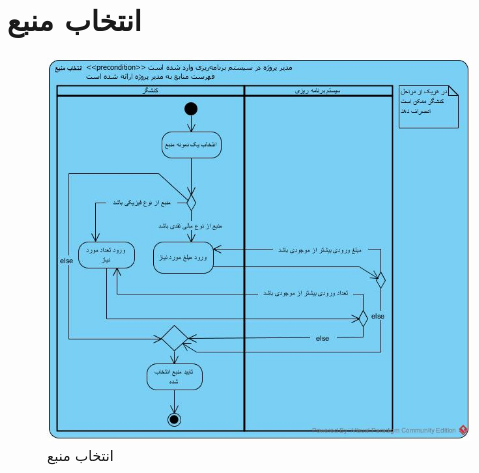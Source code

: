 \section{انتخاب منبع}
\begin{figure}[H]
	\centering
	\includegraphics[scale=0.7]{img/activity/ResourceSelection}
	\caption{انتخاب منبع}
\end{figure}


